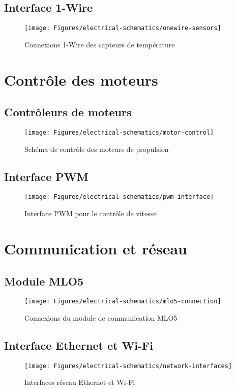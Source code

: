 \subsection{Interface 1-Wire}
\begin{figure}[!htbp]
    \centering
    \texttt{[image: Figures/electrical-schematics/onewire-sensors]}
    \caption{Connexions 1-Wire des capteurs de température}
    \label{fig:onewire-sensors}
\end{figure}

\section{Contrôle des moteurs}
\subsection{Contrôleurs de moteurs}
\begin{figure}[!htbp]
    \centering
    \texttt{[image: Figures/electrical-schematics/motor-control]}
    \caption{Schéma de contrôle des moteurs de propulsion}
    \label{fig:motor-control}
\end{figure}

\subsection{Interface PWM}
\begin{figure}[!htbp]
    \centering
    \texttt{[image: Figures/electrical-schematics/pwm-interface]}
    \caption{Interface PWM pour le contrôle de vitesse}
    \label{fig:pwm-interface}
\end{figure}

\section{Communication et réseau}
\subsection{Module MLO5}
\begin{figure}[!htbp]
    \centering
    \texttt{[image: Figures/electrical-schematics/mlo5-connection]}
    \caption{Connexions du module de communication MLO5}
    \label{fig:mlo5-connection}
\end{figure}

\subsection{Interface Ethernet et Wi-Fi}
\begin{figure}[!htbp]
    \centering
    \texttt{[image: Figures/electrical-schematics/network-interfaces]}
    \caption{Interfaces réseau Ethernet et Wi-Fi}
    \label{fig:network-interfaces}
\end{figure}

